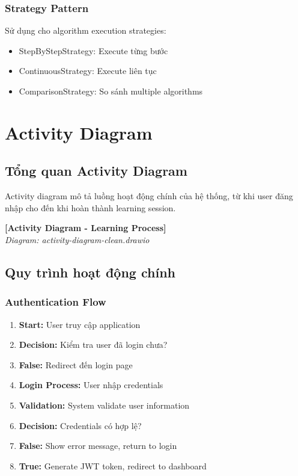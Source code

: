 \subsubsection{Strategy Pattern}
Sử dụng cho algorithm execution strategies:
\begin{itemize}
    \item StepByStepStrategy: Execute từng bước
    \item ContinuousStrategy: Execute liên tục
    \item ComparisonStrategy: So sánh multiple algorithms
\end{itemize}

\section{Activity Diagram}
\label{sec:activity-diagram}

\subsection{Tổng quan Activity Diagram}
\label{subsec:activity-overview}

Activity diagram mô tả luồng hoạt động chính của hệ thống, từ khi user đăng nhập cho đến khi hoàn thành learning session.

\begin{center}
\textbf{[Activity Diagram - Learning Process]}\\
\textit{Diagram: activity-diagram-clean.drawio}
\end{center}

\subsection{Quy trình hoạt động chính}

\subsubsection{Authentication Flow}
\begin{enumerate}
    \item \textbf{Start:} User truy cập application
    \item \textbf{Decision:} Kiểm tra user đã login chưa?
    \item \textbf{False:} Redirect đến login page
    \item \textbf{Login Process:} User nhập credentials
    \item \textbf{Validation:} System validate user information
    \item \textbf{Decision:} Credentials có hợp lệ?
    \item \textbf{False:} Show error message, return to login
    \item \textbf{True:} Generate JWT token, redirect to dashboard
\end{enumerate}

